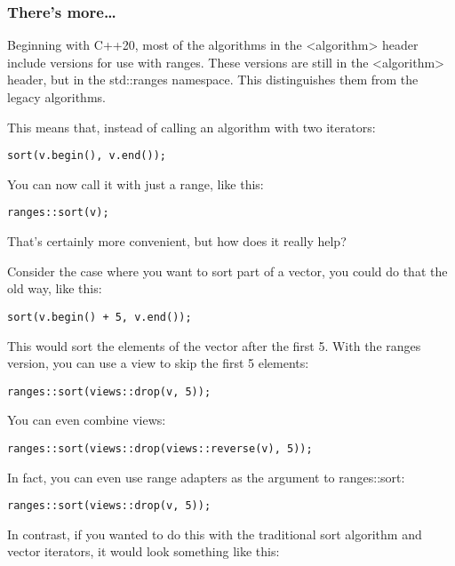 \subsubsection{There's more…}

Beginning with C++20, most of the algorithms in the <algorithm> header include versions for use with ranges. These versions are still in the <algorithm> header, but in the std::ranges namespace. This distinguishes them from the legacy algorithms.

This means that, instead of calling an algorithm with two iterators:

\begin{lstlisting}[style=styleCXX]
sort(v.begin(), v.end());
\end{lstlisting}

You can now call it with just a range, like this:

\begin{lstlisting}[style=styleCXX]
ranges::sort(v);
\end{lstlisting}

That's certainly more convenient, but how does it really help?

Consider the case where you want to sort part of a vector, you could do that the old way, like this:

\begin{lstlisting}[style=styleCXX]
sort(v.begin() + 5, v.end());
\end{lstlisting}

This would sort the elements of the vector after the first 5. With the ranges version, you can use a view to skip the first 5 elements:

\begin{lstlisting}[style=styleCXX]
ranges::sort(views::drop(v, 5));
\end{lstlisting}

You can even combine views:

\begin{lstlisting}[style=styleCXX]
ranges::sort(views::drop(views::reverse(v), 5));
\end{lstlisting}

In fact, you can even use range adapters as the argument to ranges::sort:

\begin{lstlisting}[style=styleCXX]
	ranges::sort(views::drop(v, 5));
\end{lstlisting}

In contrast, if you wanted to do this with the traditional sort algorithm and vector iterators, it would look something like this:

